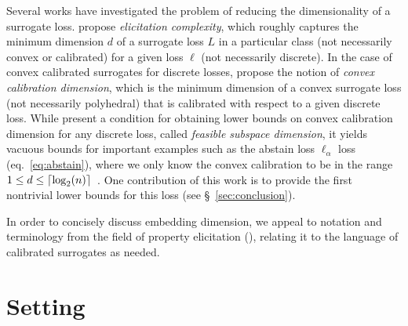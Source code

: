 \documentclass[final]{colt2020} %
\newcommand{\ellabs}[1]{\ell_{#1}}
\DeclarePairedDelimiter\ceil{\lceil}{\rceil}
\begin{document}
Several works have investigated the problem of reducing the dimensionality of a surrogate loss.
\citet{frongillo2015elicitation} propose \emph{elicitation complexity}, which roughly captures the minimum dimension $d$ of a surrogate loss $L$ in a particular class (not necessarily convex or calibrated) for a given loss $\ell$ (not necessarily discrete).
In the case of convex calibrated surrogates for discrete losses, \citet{ramaswamy2016convex} propose the notion of \emph{convex calibration dimension}, which is the minimum dimension of a convex surrogate loss (not necessarily polyhedral) that is calibrated with respect to a given discrete loss.
While \citet{ramaswamy2016convex} present a condition for obtaining lower bounds on convex calibration dimension for any discrete loss, called \emph{feasible subspace dimension}, it yields vacuous bounds for important examples such as the abstain loss $\ellabs{\alpha}$ loss (eq.~\eqref{eq:abstain}), where we only know the convex calibration to be in the range $1\leq d\leq \ceil{\log_2(n)}$~\citep{ramaswamy2018consistent}.
One contribution of this work is to provide the first nontrivial lower bounds for this loss (see \S~\ref{sec:conclusion}).


In order to concisely discuss embedding dimension, we appeal to notation and terminology from the field of property elicitation (\citep{savage1971elicitation, osband1985information-eliciting, gneiting2007strictly, lambert2009eliciting, lambert2018elicitation}), relating it to the language of calibrated surrogates as needed.

\section{Setting}

\end{document}
